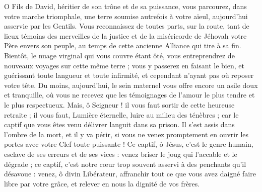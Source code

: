 \documentclass[%
fontsize=10%
,a6paper%
,DIV=13%
]{scrartcl}
\begin{document}

O Fils de David, héritier de son trône et de sa puissance, vous parcourez, dans votre marche triomphale, une terre soumise autrefois à votre aïeul, aujourd’hui asservie par les Gentils. Vous reconnaissez de toutes parts, sur la route, tant de lieux témoins des merveilles de la justice et de la miséricorde de Jéhovah votre Père envers son peuple, au temps de cette ancienne Alliance qui tire à sa fin. Bientôt, le nuage virginal qui vous couvre étant ôté, vous entreprendrez de nouveaux voyages sur cette même terre ; vous y passerez en faisant le bien, et guérissant toute langueur et toute infirmité, et cependant n’ayant pas où reposer votre tête. Du moins, aujourd’hui, le sein maternel vous offre encore un asile doux et tranquille, où vous ne recevez que les témoignages de l’amour le plus tendre et le plus respectueux. Mais, ô Seigneur ! il vous faut sortir de cette heureuse retraite ; il vous faut, Lumière éternelle, luire au milieu des ténèbres ; car le captif que vous êtes venu délivrer languit dans sa prison. Il s’est assis dans l’ombre de la mort, et il y va périr, si vous ne venez promptement en ouvrir les portes avec votre Clef toute puissante ! Ce captif, ô Jésus, c’est le genre humain, esclave de ses erreurs et de ses vices : venez briser le joug qui l’accable et le dégrade ; ce captif, c’est notre cœur trop souvent asservi à des penchants qu’il désavoue : venez, ô divin Libérateur, affranchir tout ce que vous avez daigné faire libre par votre grâce, et relever en nous la dignité de vos frères.

\end{document}
